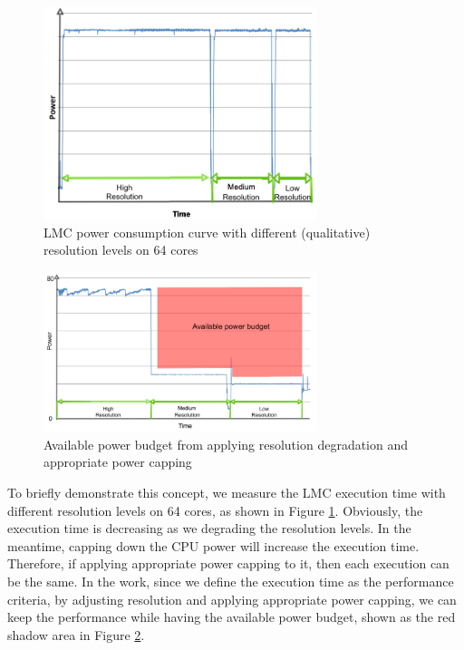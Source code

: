 \begin{figure}[H]
	\centering
    \includegraphics[width=8cm]{figs/LMCruntime.png}
        \caption{LMC power consumption curve with different (qualitative) resolution levels on 64 cores}
        \label{fig:LMCruntime}
\end{figure}


\begin{figure}[H]
	\centering
    \includegraphics[width=8cm]{figs/Available_power_budget.png}
        \caption{Available power budget from applying resolution degradation and appropriate power capping}
        \label{fig:Available_power_budget}
\end{figure}


To briefly demonstrate this concept, we measure the LMC execution time with different resolution levels on 64 cores, as shown in Figure \ref{fig:LMCruntime}. Obviously, the execution time is decreasing as we degrading the resolution levels. In the meantime, capping down the CPU power will increase the execution time. Therefore, if applying appropriate power capping to it, then each execution can be the same. In the work, since we define the execution time as the performance criteria, by adjusting resolution and applying appropriate power capping, we can keep the performance while having the available power budget, shown as the red shadow area in Figure \ref{fig:Available_power_budget}.



